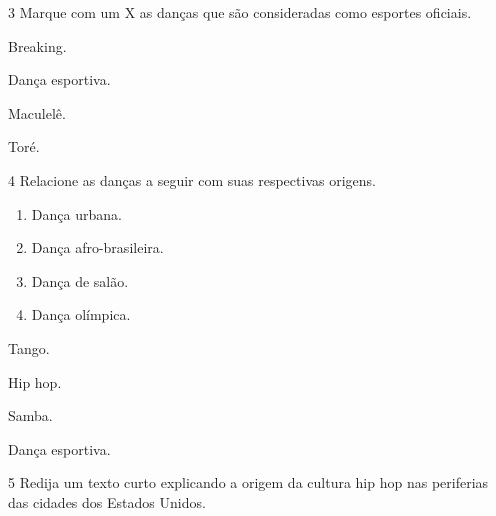 
\num{3}  Marque com um X as danças que são consideradas como esportes oficiais.

\begin{boxlist}
 Breaking.

 Dança esportiva.

 Maculelê.

 Toré.
\end{boxlist}


\num{4}  Relacione as danças a seguir com suas respectivas origens.

\begin{enumerate}
\item Dança urbana.

\item Dança afro-brasileira.

\item Dança de salão.

\item Dança olímpica.
\end{enumerate}

\begin{boxlist}
 Tango.

 Hip hop.

 Samba.

 Dança esportiva.
\end{boxlist}


\num{5} Redija um texto curto explicando a origem da cultura hip hop
nas periferias das cidades dos Estados Unidos.



